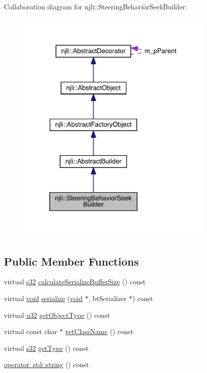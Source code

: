 Collaboration diagram for njli\+:\+:Steering\+Behavior\+Seek\+Builder\+:\nopagebreak
\begin{figure}[H]
\begin{center}
\leavevmode
\includegraphics[width=274pt]{classnjli_1_1_steering_behavior_seek_builder__coll__graph}
\end{center}
\end{figure}
\subsection*{Public Member Functions}
\begin{DoxyCompactItemize}
\item 
virtual \mbox{\hyperlink{_util_8h_aa62c75d314a0d1f37f79c4b73b2292e2}{s32}} \mbox{\hyperlink{classnjli_1_1_steering_behavior_seek_builder_ac33d9f089b01a2fc7f5339151d552a21}{calculate\+Serialize\+Buffer\+Size}} () const
\item 
virtual \mbox{\hyperlink{_thread_8h_af1e856da2e658414cb2456cb6f7ebc66}{void}} \mbox{\hyperlink{classnjli_1_1_steering_behavior_seek_builder_afacd2ae174e22259bb5b8b1cdc6b690f}{serialize}} (\mbox{\hyperlink{_thread_8h_af1e856da2e658414cb2456cb6f7ebc66}{void}} $\ast$, bt\+Serializer $\ast$) const
\item 
virtual \mbox{\hyperlink{_util_8h_a10e94b422ef0c20dcdec20d31a1f5049}{u32}} \mbox{\hyperlink{classnjli_1_1_steering_behavior_seek_builder_a67b69c5df3080e047ef80b0730b2a354}{get\+Object\+Type}} () const
\item 
virtual const char $\ast$ \mbox{\hyperlink{classnjli_1_1_steering_behavior_seek_builder_aef230103bd57064629e51d1375c27e68}{get\+Class\+Name}} () const
\item 
virtual \mbox{\hyperlink{_util_8h_aa62c75d314a0d1f37f79c4b73b2292e2}{s32}} \mbox{\hyperlink{classnjli_1_1_steering_behavior_seek_builder_aed95b1cfbded96558a4d9d884b478af2}{get\+Type}} () const
\item 
\mbox{\hyperlink{classnjli_1_1_steering_behavior_seek_builder_a4b947ba8adc5f1dc5219ebfa44ea2595}{operator std\+::string}} () const
\end{DoxyCompactItemize}
